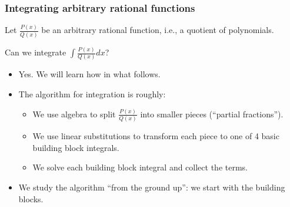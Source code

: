 \begin{frame}
\frametitle{Integrating arbitrary rational functions}
Let $\frac{P(x)}{Q(x)}$ be an arbitrary rational function, i.e., a quotient of polynomials.
\begin{question}
Can we integrate $\displaystyle\int \frac{P(x)}{Q(x)}dx$?
\end{question}
\begin{itemize}
\item Yes. We will learn how in what follows.
\item The algorithm for integration is roughly:
\begin{itemize}
\item We use algebra to split $\frac{P(x)}{Q(x)}$ into smaller pieces (``partial fractions''). 
\item We use linear substitutions to transform each piece to one of 4 basic building block integrals.
\item We solve each building block integral and collect the terms.
\end{itemize}
\item We study the algorithm ``from the ground up'': we start with the building blocks.
\end{itemize}
\end{frame}

